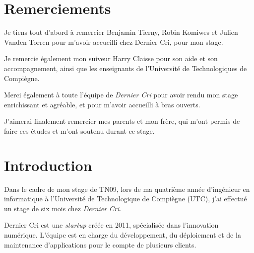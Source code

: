 \section{Remerciements}\label{remerciements}

\bigskip

Je tiens tout d'abord à remercier Benjamin Tierny, Robin Komiwes et
Julien Vanden Torren pour m'avoir accueilli chez Dernier Cri, pour mon
stage.

\bigskip

Je remercie également mon suiveur Harry Claisse pour son aide et son
accompagnement, ainsi que les enseignants de l'Université de
Technologiques de Compiègne.

\bigskip

Merci également à toute l'équipe de \emph{Dernier Cri} pour avoir rendu
mon stage enrichissant et agréable, et pour m'avoir accueilli à bras
ouverts.

\bigskip

J'aimerai finalement remercier mes parents et mon frère, qui m'ont
permis de faire ces études et m'ont soutenu durant ce stage.

\newpage

\section{Introduction}\label{introduction}

\bigskip

Dans le cadre de mon stage de TN09, lors de ma quatrième année
d'ingénieur en informatique à l'Université de Technologique de Compiègne
(UTC), j'ai effectué un stage de six mois chez \emph{Dernier Cri}.

\bigskip

Dernier Cri est une \emph{startup} créée en 2011, spécialisée dans
l'innovation numérique. L'équipe est en charge du développement, du
déploiement et de la maintenance d'applications pour le compte de
plusieurs clients.

